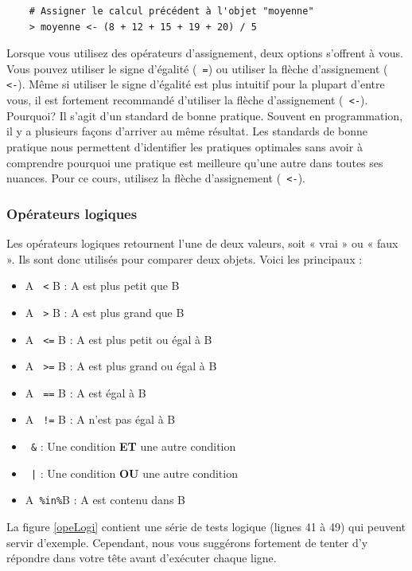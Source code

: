 \documentclass[10.5pt,a4paper]{article}
\newcommand{\rcode}[1]{\texttt{\color{rstudio} #1}}
\begin{document}
  \begin{lstlisting}
    # Assigner le calcul précédent à l'objet "moyenne"
    > moyenne <- (8 + 12 + 15 + 19 + 20) / 5
  \end{lstlisting}

Lorsque vous utilisez des opérateurs d'assignement, deux options s'offrent à vous. Vous pouvez utiliser le signe d'égalité (\rcode{=}) ou utiliser la flèche d'assignement (\rcode{<-}). Même si utiliser le signe d'égalité est plus intuitif pour la plupart d'entre vous, il est fortement recommandé d'utiliser la flèche d'assignement (\rcode{<-}). Pourquoi? Il s'agit d'un standard de bonne pratique. Souvent en programmation, il y a plusieurs façons d'arriver au même résultat. Les standards de bonne pratique nous permettent d'identifier les pratiques optimales sans avoir à comprendre pourquoi une pratique est meilleure qu'une autre dans toutes ses nuances. Pour ce cours, utilisez la flèche d'assignement (\rcode{<-}). 
    
    \subsubsection{Opérateurs logiques}
    Les opérateurs logiques retournent l'une de deux valeurs, soit « vrai » ou « faux ». Ils sont donc utilisés pour comparer deux objets. Voici les principaux : 
    \begin{itemize}
      \item A \rcode{<} B    : A est plus petit que B
      \item A \rcode{>} B    : A est plus grand que B
      \item A \rcode{<=} B   : A est plus petit ou égal à B
      \item A \rcode{>=} B   : A est plus grand ou égal à B
      \item A \rcode{==} B   : A est égal à B
      \item A \rcode{!=} B   : A n'est pas égal à B
      \item \rcode{\&}       : Une condition \textbf{ET} une autre condition
      \item \rcode{|}        : Une condition \textbf{OU} une autre condition
      \item A\rcode{\%in\%}B : A est contenu dans B
    \end{itemize}
    
    La figure \ref{opeLogi} contient une série de tests logique (lignes 41 à 49) qui peuvent servir d'exemple. Cependant, nous vous suggérons fortement de tenter d'y répondre dans votre tête avant d'exécuter chaque ligne. 
   
\end{document}
